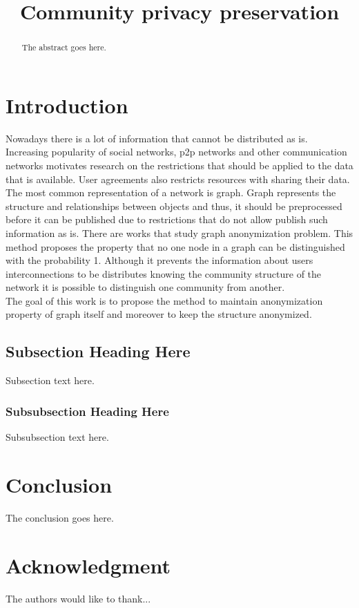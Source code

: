 \documentclass[conference]{IEEEtran}
\begin{document}
\title{Community privacy preservation}

\author{
\and
{}
\and
{}
}

\maketitle


\begin{abstract}
	The abstract goes here.
\end{abstract}

\IEEEpeerreviewmaketitle

\section{Introduction}
	Nowadays there is a lot of information that cannot be distributed as is. Increasing popularity of social networks, p2p networks and other communication networks motivates research on the restrictions that should be applied to the data that is available. User agreements also restricts resources with sharing their data.\\
	The most common representation of a network is graph. Graph represents the structure and relationships between objects and thus, it should be preprocessed before it can be published due to restrictions that do not allow publish such information as is. There are works that study graph anonymization problem. This method proposes the property that no one node in a graph can be distinguished with the probability 1. Although it prevents the information about users interconnections to be distributes knowing the community structure of the network it is possible to distinguish one community from another.\\
	The goal of this work is to propose the method to maintain anonymization property of graph itself and moreover to keep the structure anonymized. 

\subsection{Subsection Heading Here}
	Subsection text here.

\subsubsection{Subsubsection Heading Here}
	Subsubsection text here.

\section{Conclusion}
	The conclusion goes here.

\section*{Acknowledgment}
	The authors would like to thank...



\end{document}
